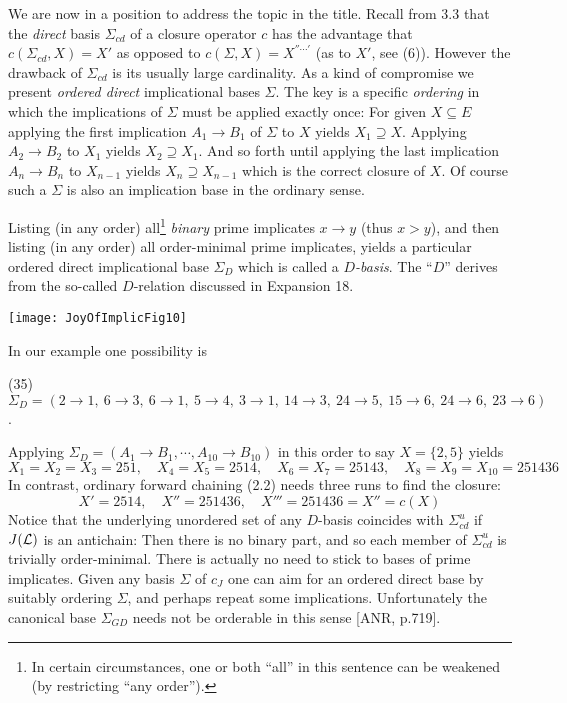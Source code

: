 \documentclass[11pt]{article}
\newcommand{\ra}{\rightarrow}
\begin{document}
We are now in a position to address the topic in the title.
Recall from 3.3 that the {\it direct} basis $\Sigma_{cd}$ of a closure operator $c$ has the advantage that $c(\Sigma_{cd}, X) = X'$ as opposed to $c(\Sigma, X) = X^{'' \cdots '}$ (as to $X'$, see (6)). However the drawback of $\Sigma_{cd}$ is its usually large cardinality. As a kind of compromise we present {\it ordered direct} implicational bases $\Sigma$. The key is a specific {\it ordering} in which the implications of $\Sigma$ must be applied exactly once: For given $X \subseteq E$ applying the first implication $A_1 \ra B_1$ of $\Sigma$ to $X$ yields $X_1 \supseteq X$. Applying $A_2 \ra B_2$ to $X_1$ yields $X_2 \supseteq X_1$. And so forth until applying the last implication $A_n \ra B_n$ to $X_{n-1}$ yields $X_n \supseteq X_{n-1}$ which is the correct closure of $X$. Of course such a $\Sigma$ is also an implication base in the ordinary sense.

Listing (in any order) all\footnote{In certain circumstances,  one or both ``all'' in this sentence can be weakened (by restricting ``any order'').} {\it binary} prime implicates $x \ra y$ (thus $x > y$), and then listing (in any order) all order-minimal prime implicates, yields a particular ordered direct implicational base $\Sigma_D$ which is called a $D${\it -basis}. The ``$D$'' derives from the so-called $D$-relation discussed in Expansion 18.



\begin{center}
\texttt{[image: JoyOfImplicFig10]}
\end{center}


 In our example one possibility is

(35) \quad $\Sigma_D = (2 \ra 1, \  6 \ra 3, \ 6 \ra 1, \ 5 \ra 4, \ 3 \ra 1, \ 14 \ra 3, \ 24 \ra 5, \ 15 \ra 6, \ 24 \ra 6, \ 23 \ra 6)$.

Applying $\Sigma_D = (A_1 \ra B_1, \cdots, A_{10} \ra B_{10})$ in this order to say $X = \{2,5\}$ yields
$$X_1=X_2 = X_3 = 251, \quad X_4=X_5 = 2514, \quad X_6=X_7 = 25143, \quad X_8 = X_9 = X_{10} = 251436$$
In contrast, ordinary forward chaining (2.2) needs three runs to find the closure:
$$X'= 2514, \quad X'' = 251436, \quad X''' = 251436 = X'' = c(X)$$
Notice that the underlying unordered set of any $D$-basis  coincides with $\Sigma_{cd}^u$ if $J({\cal L})$ is an antichain: Then there is no binary part, and so each member of $\Sigma_{cd}^u$ is trivially order-minimal. There is actually no need to stick to bases of prime implicates. Given any basis $\Sigma$ of $c_J$ one can aim for an ordered direct base by suitably ordering $\Sigma$, and perhaps repeat some implications. Unfortunately the canonical base $\Sigma_{GD}$ needs not be orderable in this sense [ANR, p.719].
\end{document}
